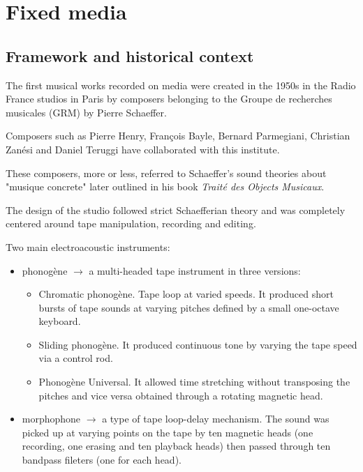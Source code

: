 \chapter{Fixed media}

\section{Framework and historical context}\label{framework-and-historical-context}

The first musical works recorded on media were created in the 1950s in the Radio France studios in Paris by composers belonging to the Groupe de recherches musicales (GRM) by Pierre Schaeffer.

Composers such as Pierre Henry, François Bayle, Bernard Parmegiani, Christian Zanési and Daniel Teruggi have collaborated with this institute.

These composers, more or less, referred to Schaeffer’s sound theories about "musique concrete" later outlined in his book  \textit{Traité des Objects Musicaux}.

The design of the studio followed strict Schaefferian theory and was completely centered around tape manipulation, recording and editing.

Two main electroacoustic instruments:

\begin{itemize}
\tightlist
\item phonogène \(\rightarrow\) a multi-headed tape instrument in three versions:
    \begin{itemize}
    \tightlist
    \item Chromatic phonogène. Tape loop at varied speeds. It produced short bursts of tape sounds at varying pitches defined by a small one-octave keyboard.
    \item Sliding phonogène. It produced continuous tone by varying the tape speed via a control rod.
    \item Phonogène Universal. It allowed time stretching without transposing the pitches and vice versa obtained through a rotating magnetic head.
    \end{itemize}
\item morphophone \(\rightarrow\)  a type of tape loop-delay mechanism. The sound was picked up at varying points on the tape by ten magnetic heads (one recording, one erasing and ten playback heads) then passed through ten bandpass fileters (one for each head).
\end{itemize}

